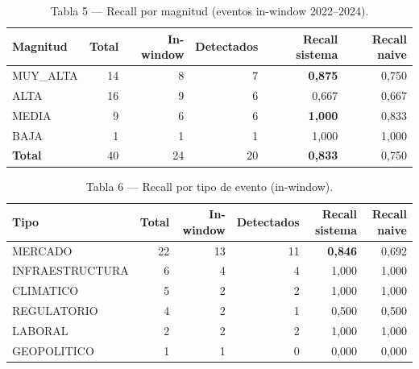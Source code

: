 \documentclass[11pt,a4paper]{article}
\begin{document}
\begin{table}[H]
\centering
\small
\caption{Tabla 5 — Recall por magnitud (eventos in-window 2022--2024).}
\label{tab:t5}
\begin{tabular}{lrrrrr}
\toprule
\textbf{Magnitud} & \textbf{Total} & \textbf{In-window} & \textbf{Detectados} & \textbf{Recall sistema} & \textbf{Recall naive} \\
\midrule
MUY\_ALTA & 14 & 8 & 7 & \textbf{0{,}875} & 0{,}750 \\
ALTA      & 16 & 9 & 6 & 0{,}667 & 0{,}667 \\
MEDIA     &  9 & 6 & 6 & \textbf{1{,}000} & 0{,}833 \\
BAJA      &  1 & 1 & 1 & 1{,}000 & 1{,}000 \\
\midrule
\textbf{Total} & 40 & 24 & 20 & \textbf{0{,}833} & 0{,}750 \\
\bottomrule
\end{tabular}
\end{table}

\begin{table}[H]
\centering
\small
\caption{Tabla 6 — Recall por tipo de evento (in-window).}
\label{tab:t6}
\begin{tabular}{lrrrrr}
\toprule
\textbf{Tipo} & \textbf{Total} & \textbf{In-window} & \textbf{Detectados} & \textbf{Recall sistema} & \textbf{Recall naive} \\
\midrule
MERCADO         & 22 & 13 & 11 & \textbf{0{,}846} & 0{,}692 \\
INFRAESTRUCTURA &  6 &  4 &  4 & 1{,}000 & 1{,}000 \\
CLIMATICO       &  5 &  2 &  2 & 1{,}000 & 1{,}000 \\
REGULATORIO     &  4 &  2 &  1 & 0{,}500 & 0{,}500 \\
LABORAL         &  2 &  2 &  2 & 1{,}000 & 1{,}000 \\
GEOPOLITICO     &  1 &  1 &  0 & 0{,}000 & 0{,}000 \\
\bottomrule
\end{tabular}
\end{table}
\end{document}
